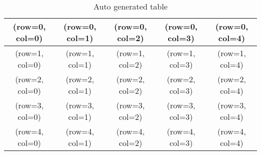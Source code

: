 \documentclass[a4paper,11pt]{article}
\begin{document}
\begin{table}
\caption{Auto generated table}
\centering
\begin{tabular}{|c|c|c|c|c|}

\hline
(row=0, col=0) & (row=0, col=1) & (row=0, col=2) & (row=0, col=3) & (row=0, col=4) \\
\hline
(row=1, col=0) & (row=1, col=1) & (row=1, col=2) & (row=1, col=3) & (row=1, col=4) \\
\hline
(row=2, col=0) & (row=2, col=1) & (row=2, col=2) & (row=2, col=3) & (row=2, col=4) \\
\hline
(row=3, col=0) & (row=3, col=1) & (row=3, col=2) & (row=3, col=3) & (row=3, col=4) \\
\hline
(row=4, col=0) & (row=4, col=1) & (row=4, col=2) & (row=4, col=3) & (row=4, col=4) \\
\hline

\end{tabular}
\end{table}
\end{document}
